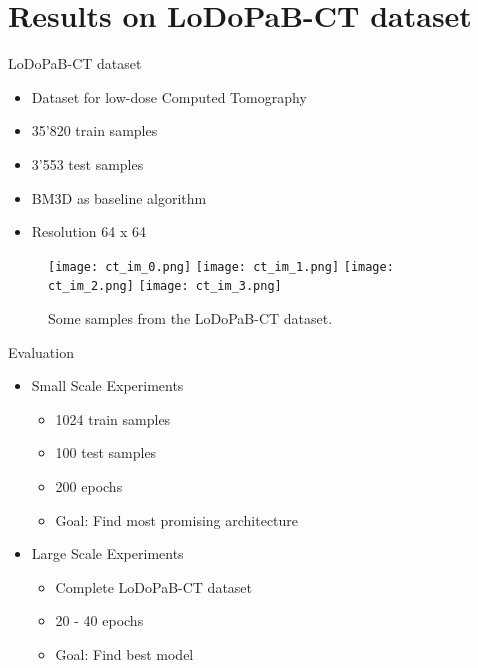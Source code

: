 
\section{Results on LoDoPaB-CT dataset}

\begin{frame}{LoDoPaB-CT dataset}
\begin{itemize}
    \item Dataset for low-dose Computed Tomography
    \item 35'820 train samples
    \item 3'553 test samples
    \item BM3D as baseline algorithm
    \item Resolution 64 x 64
\end{itemize}

\begin{figure}
    \centering
    \hfill
    \texttt{[image: ct\_im\_0.png]}
    \hfill
    \texttt{[image: ct\_im\_1.png]}
    \hfill
    \texttt{[image: ct\_im\_2.png]}
    \hfill
    \texttt{[image: ct\_im\_3.png]}
    \hfill
    \caption{Some samples from the LoDoPaB-CT dataset.}
  \end{figure}
\end{frame}


\begin{frame}{Evaluation}
\begin{itemize}
    \item Small Scale Experiments
    \begin{itemize}
        \item 1024 train samples
        \item 100 test samples
        \item 200 epochs
        \item<2> \alert{Goal: Find most promising architecture}
    \end{itemize}
    \item Large Scale Experiments
    \begin{itemize}
        \item Complete LoDoPaB-CT dataset
        \item 20 - 40 epochs
        \item<2> \alert{Goal: Find best model}
    \end{itemize}
\end{itemize}
\end{frame}

